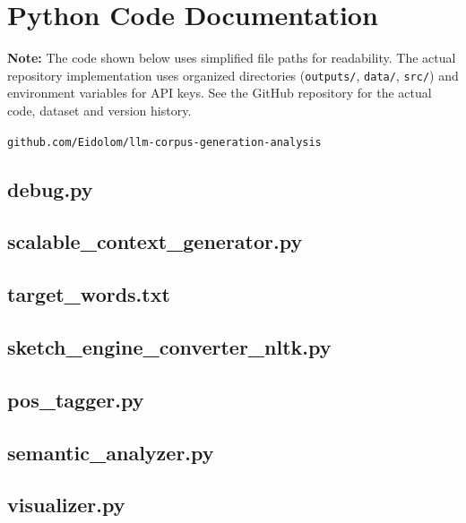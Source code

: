 \clearpage
\section{Python Code Documentation}

\noindent\textbf{Note:} The code shown below uses simplified file paths for readability. The actual repository implementation uses organized directories (\texttt{outputs/}, \texttt{data/}, \texttt{src/}) and environment variables for API keys. See the GitHub repository for the actual code, dataset and version history. 

\texttt{github.com/Eidolom/llm-corpus-generation-analysis}

\subsection{debug.py}


\subsection{scalable\_context\_generator.py}


\subsection{target\_words.txt}


\subsection{sketch\_engine\_converter\_nltk.py}


\subsection{pos\_tagger.py}


\subsection{semantic\_analyzer.py}


\subsection{visualizer.py}

